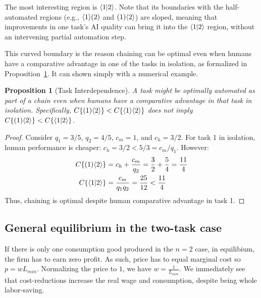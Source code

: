 \documentclass{article}
\newtheorem{proposition}[theorem]{Proposition}
\begin{document}
The most interesting region is $\langle 1|2 \rangle$.
Note that its boundaries with the half-automated regions (e.g., $\langle 1 \rangle( 2 )$ and $( 1 )\langle 2 \rangle$) are sloped, meaning that improvements in one task's AI quality can bring it into the $\langle 1|2 \rangle$ region, without an intervening partial automation step.

This curved boundary is the reason chaining can be optimal even when humans have a comparative advantage in one of the tasks in isolation, as formalized in Proposition~\ref{proposition:interdependence}.
It can shown simply with a numerical example.

\begin{proposition}[Task Interdependence] \label{proposition:interdependence}
A task might be optimally automated as part of a chain even when humans have a comparative advantage in that task in isolation.
Specifically, $C\{ ( 1 )\langle 2 \rangle \} < C\{ \langle 1 \rangle\langle 2 \rangle \}$ does not imply $C\{ ( 1 )\langle 2 \rangle \} < C\{ \langle 1|2 \rangle \}$.
\end{proposition}
\begin{proof}
Consider $q_1 = 3/5$, $q_2 = 4/5$, $c_m = 1$, and $c_h = 3/2$.
For task 1 in isolation, human performance is cheaper: $c_h = 3/2 < 5/3 = c_m/q_1$.
However:
\begin{align*}
    C\{ ( 1 )\langle 2 \rangle \} &= c_h + \frac{c_m}{q_2} = \frac{3}{2} + \frac{5}{4} = \frac{11}{4} \\
    C\{ \langle 1|2 \rangle \} &= \frac{c_m}{q_1q_2} = \frac{25}{12} < \frac{11}{4}
\end{align*}
Thus, chaining is optimal despite human comparative advantage in task 1.
\end{proof}

\subsection{General equilibrium in the two-task case}
If there is only one consumption good produced in the $n=2$ case, in equilibium, the firm has to earn zero profit. 
As such, price has to equal marginal cost so $p = w L_{min}$. 
Normalizing the price to $1$, we have $w = \frac{1}{L_{min}}$.
We immediately see that cost-reductions increase the real wage and consumption, despite being whole labor-saving. 
\end{document}
